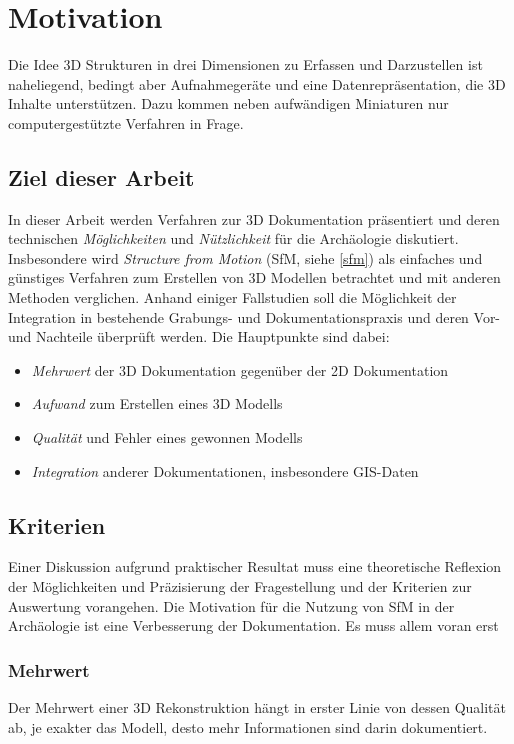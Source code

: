 \chapter{Motivation}
	Die Idee 3D Strukturen in drei Dimensionen zu Erfassen und Darzustellen ist naheliegend, bedingt aber Aufnahmegeräte und eine Datenrepräsentation, die 3D Inhalte unterstützen. Dazu kommen neben aufwändigen Miniaturen nur computergestützte Verfahren in Frage.
	
	\section{Ziel dieser Arbeit} \label{frag:ziel}
		In dieser Arbeit werden Verfahren zur 3D Dokumentation präsentiert und deren technischen \emph{Möglichkeiten} und \emph{Nützlichkeit} für die Archäologie diskutiert.
		Insbesondere wird \emph{Structure from Motion} (SfM, siehe \autoref{sfm}) als einfaches und günstiges Verfahren zum Erstellen von 3D Modellen betrachtet und mit anderen Methoden verglichen.
		Anhand einiger Fallstudien soll die Möglichkeit der Integration in bestehende Grabungs- und Dokumentationspraxis und deren Vor- und Nachteile überprüft werden.
		Die Hauptpunkte sind dabei:
		\begin{itemize}
			\item
			\emph{Mehrwert} der 3D Dokumentation gegenüber der 2D Dokumentation
			\item
			\emph{Aufwand} zum Erstellen eines 3D Modells
			\item
			\emph{Qualität} und Fehler eines gewonnen Modells
			\item
			\emph{Integration} anderer Dokumentationen, insbesondere GIS-Daten
		\end{itemize}
	
	\section{Kriterien} \label{frag:kriterien}
		Einer Diskussion aufgrund praktischer Resultat muss eine theoretische Reflexion der Möglichkeiten und Präzisierung der Fragestellung und  der Kriterien zur Auswertung vorangehen.
		Die Motivation für die Nutzung von SfM in der Archäologie ist eine Verbesserung der Dokumentation. Es muss allem voran erst
		\subsection{Mehrwert}
			Der Mehrwert einer 3D Rekonstruktion hängt in erster Linie von dessen Qualität ab, je exakter das Modell, desto mehr Informationen sind darin dokumentiert.
			
